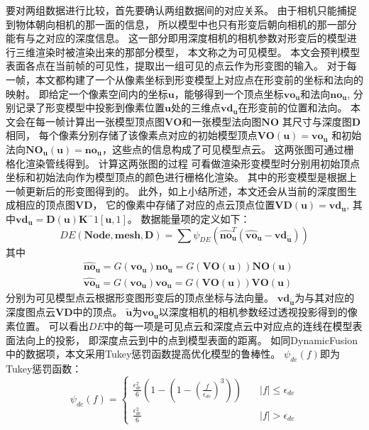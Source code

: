 要对两组数据进行比较，首先要确认两组数据间的对应关系。
由于相机只能捕捉到物体朝向相机的那一面的信息，
所以模型中也只有形变后朝向相机的那一部分能有与之对应的深度信息。
这一部分即用深度相机的相机参数对形变后的模型进行三维渲染时被渲染出来的那部分模型，
本文称之为可见模型。
本文会预判模型表面各点在当前帧的可见性，提取出一组可见的点云作为形变图的输入。
对于每一帧，本文都构建了一个从像素坐标到形变模型上对应点在形变前的坐标和法向的映射。
即给定一个像素空间内的坐标$\bm{u}$，能够得到一个顶点坐标$\bm{vo_u}$和法向$\bm{no_u}$,
分别记录了形变模型中投影到像素位置$\bm{u}$处的三维点$\bm{vd_u}$在形变前的位置和法向。
本文会在每一帧计算出一张模型顶点图$\bm{VO}$和一张模型法向图$\bm{NO}$
其尺寸与深度图$\bm{D}$相同，
每个像素分别存储了该像素点对应的初始模型顶点$\bm{VO}(\bm{u})=\bm{vo_u}$
和初始法向$\bm{NO_u}(\bm{u})=\bm{no_u}$，这些点的信息构成了可见模型点云。
这两张图可通过栅格化渲染管线得到。
计算这两张图的过程
可看做渲染形变模型时分别用初始顶点坐标和初始法向作为模型顶点的颜色进行栅格化渲染。
其中的形变模型是根据上一帧更新后的形变图得到的。
此外，如上小结所述，本文还会从当前的深度图生成相应的顶点图$\bm{VD}$，
它的像素中存储了对应的点云顶点位置$\bm{VD}(\bm{u}) = \bm{vd_u}$,
其中$\bm{vd_u}=\bm{D}(\bm{u})\bm{K}^-1[\bm{u},1]$。
数据能量项的定义如下：
\begin{equation}
    DE(\bm{Node},\bm{mesh},\bm{D})=
    \sum \psi_{DE}(
        \hat{\bm{no}}_{\bm{u}}^T
        (
            \hat{\bm{vo}}_{\bm{u}}
            -
            \bm{vd_{\widetilde{\bm{u}}}}
        )
    )
\end{equation}
其中
\begin{align}
    &\hat{\bm{no}}_{\bm{u}}=G(\bm{vo_u})\bm{no_u}=G(\bm{VO}(\bm{u}))\bm{NO}(\bm{u})\\
    &\hat{\bm{vo}}_{\bm{u}}=G(\bm{vo_u})\bm{vo_u}=G(\bm{VO}(\bm{u}))\bm{VO}(\bm{u})
\end{align}
分别为可见模型点云根据形变图形变后的顶点坐标与法向量。
$\bm{vd_{\widetilde{\bm{u}}}}$为与其对应的深度图点云$\bm{VD}$中的顶点。
$\widetilde{\bm{u}}$为$\bm{vo_u}$以深度相机的相机参数经过透视投影得到的像素位置。
可以看出$DE$中的每一项是可见点云和深度点云中对应点的连线在模型表面法向上的投影，
即深度点云到中的点到模型表面的距离。
如同DynamicFusion中的数据项，本文采用Tukey惩罚函数提高优化模型的鲁棒性。
$\psi_{de}(f)$即为Tukey惩罚函数：
\begin{equation}
    \psi_{de}(f)= 
    \begin{cases}
        \frac{\epsilon_{de}^2}{6}(1-(1-(\frac{f}{\epsilon_{de}})^3))
        &\quad |f|\leq\epsilon_{de}\\

        \frac{\epsilon_{de}^2}{6}
        &\quad |f|>\epsilon_{de}
        
    \end{cases}
\end{equation}
